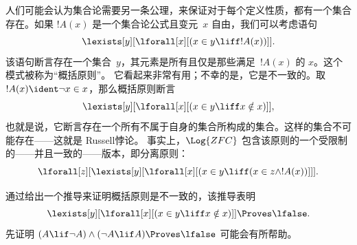 \documentclass[../../../include/open-logic-section]{subfiles}
\begin{document}
人们可能会认为集合论需要另一条公理，来保证对于每个定义性质，都有一个集合存在。如果 $!A(x)$ 是一个集合论公式且变元~$x$ 自由，我们可以考虑语句
\[
\lexists[y][\lforall[x][(x \in y \liff !A(x))]].
\]
该语句断言存在一个集合~$y$，其元素是所有且仅是那些满足~$!A(x)$ 的 $x$。这个模式被称为“概括原则”。
它看起来非常有用；不幸的是，它是不一致的。取 $!A(x) \ident \lnot x \in x$，那么概括原则断言
\[
\lexists[y][\lforall[x][(x \in y \liff x \notin x)]],
\]
也就是说，它断言存在一个所有不属于自身的集合所构成的集合。这样的集合不可能存在——这就是 Russell悖论。
事实上，$\Log{ZFC}$ 包含该原则的一个受限制的——并且一致的——版本，即分离原则：
\[
\lforall[z][\lexists[y][\lforall[x][(x \in y \liff (x \in z \land
      !A(x))]]].
\]

\begin{prob}
通过给出一个推导来证明概括原则是不一致的，该推导表明
\[
\lexists[y][\lforall[x][(x \in y \liff x \notin x)]] \Proves \lfalse.
\]
先证明 $(A \lif \lnot A) \land (\lnot A \lif A)
\Proves \lfalse$ 可能会有所帮助。
\end{prob}
\end{document}
